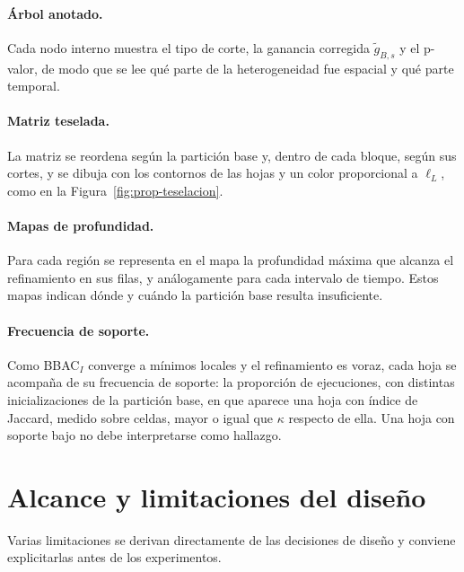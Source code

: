 \paragraph{Árbol anotado.} Cada nodo interno muestra el tipo de corte, la
ganancia corregida $\tilde g_{B,s}$ y el p-valor, de modo que se lee qué parte de la
heterogeneidad fue espacial y qué parte temporal.

\paragraph{Matriz teselada.} La matriz se reordena según la partición base y,
dentro de cada bloque, según sus cortes, y se dibuja con los contornos de las
hojas y un color proporcional a $\ell_L$, como en la
Figura~\ref{fig:prop-teselacion}.

\paragraph{Mapas de profundidad.} Para cada región se representa en el mapa la
profundidad máxima que alcanza el refinamiento en sus filas, y análogamente para
cada intervalo de tiempo. Estos mapas indican dónde y cuándo la partición base
resulta insuficiente.

\paragraph{Frecuencia de soporte.} Como BBAC$_I$ converge a mínimos locales y
el refinamiento es voraz, cada hoja se acompaña de su frecuencia de soporte:
la proporción de ejecuciones, con distintas inicializaciones de la partición
base, en que aparece una hoja con índice de Jaccard, medido sobre celdas,
mayor o igual que $\kappa$ respecto de ella. Una hoja con soporte bajo no debe
interpretarse como hallazgo.

\section{Alcance y limitaciones del diseño}\label{sec:prop-limitaciones}

Varias limitaciones se derivan directamente de las decisiones de diseño y
conviene explicitarlas antes de los experimentos.

